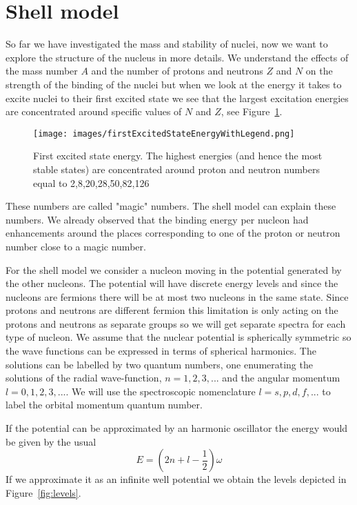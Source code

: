 \documentclass[12pt]{article}
\begin{document}
\section{Shell model}
%
%
%
So far we have investigated the mass and stability of nuclei, now we want to explore the structure of the nucleus in more details. We understand the effects of the mass number $A$ and the number of protons and neutrons $Z$ and $N$ on the strength of the binding of the nuclei but when we look at the energy it takes to excite nuclei to their first excited state we see that the largest excitation energies are concentrated around specific values of $N$ and $Z$, see Figure~\ref{fig:firstExcited}.  
\begin{figure}
\begin{center}
\texttt{[image: images/firstExcitedStateEnergyWithLegend.png]}
\end{center}
\caption{First excited state energy. The highest energies (and hence the most stable states) are concentrated around proton and neutron numbers equal to 2,8,20,28,50,82,126}\label{fig:firstExcited}
\end{figure}
These numbers are called "magic" numbers. The shell model can explain these numbers. We already observed that the binding energy per nucleon had enhancements around the places corresponding to one of the proton or neutron number close to a magic number.

For the shell model we consider a nucleon moving in the potential generated by the other nucleons. The potential will have discrete energy levels and since the nucleons are fermions there will be at most two nucleons in the same state. Since protons and neutrons are different fermion this limitation is only acting on the protons and neutrons as separate groups so we will get separate spectra for each type of nucleon. We assume that the nuclear potential is spherically symmetric so the wave functions can be expressed in terms of spherical harmonics. The solutions can be labelled by two quantum numbers, one enumerating the solutions of the radial wave-function, $n=1,2,3,...$ and the angular momentum $l=0,1,2,3,...$. We will use the spectroscopic nomenclature $l=s,p,d,f,...$ to label the orbital momentum quantum number. 

If the potential can be approximated by an harmonic oscillator the energy would be given by the usual
\[E=\left(2n+l-\frac{1}{2}\right)\omega\] 
If we approximate it as an infinite well potential we obtain the levels depicted in Figure~\ref{fig:levels}.
\end{document}
